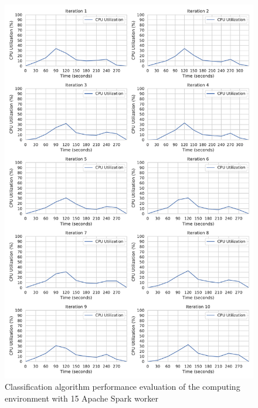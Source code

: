 \begin{figure}[h]
\centering
\includegraphics[scale=0.4]{images/07_evaluation/taxi/taxi_15_worker_cpu_performance}
\caption{Classification algorithm performance evaluation of the computing environment with 15 Apache Spark worker}
\label{fig:07_mortgage_static-cpu_results}
\end{figure}

